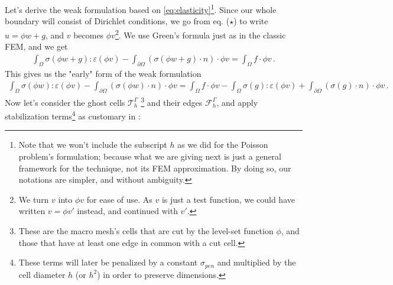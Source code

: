 Let's derive the weak formulation based on \eqref{eq:elasticity}\footnote{Note that we won't include the subscript $h$ as we did for the Poisson problem's \phifem formulation; because what we are giving next is just a general framework for the technique, not its FEM approximation. By doing so, our notations are simpler, and without ambiguity.}. Since our whole boundary will consist of Dirichlet conditions, we go from eq. ($\star$) to write $u=\phi w + g$, and $v$ becomes $\phi v$\footnote{We turn $v$ into $\phi v$ for ease of use. As $v$ is just a test function, we could have written $v = \phi v'$ instead, and continued with $v'$.}. We use Green's formula just as in the classic FEM, and we get
\begin{align*}
    \int_{\Omega} \sigma(\phi w + g) : \varepsilon(\phi v) - \int_{\partial\Omega} (\sigma(\phi w + g) \cdot n)  \cdot \phi v = \int_{\Omega} f \cdot \phi v \,.
\end{align*}
This gives us the "early" form of the weak formulation
\begin{align}
    \int_{\Omega} \sigma(\phi w) : \varepsilon(\phi v) - \int_{\partial\Omega} (\sigma(\phi w) \cdot n) \cdot \phi v = \int_{\Omega} f \cdot \phi v - \int_{\Omega} \sigma(g) : \varepsilon(\phi v) + \int_{\partial\Omega} (\sigma(g) \cdot n) \cdot \phi  v \,.
    \label{eq:1}
\end{align}
Now let's consider the ghost cells $\mathcal{T}_h^{\Gamma}$ \footnote{These are the macro mesh's cells that are cut by the level-set function $\phi$, and those that have at least one edge in common with a cut cell.} and their edges $\mathcal{F}_h^{\Gamma}$, and apply stabilization terms\footnote{These terms will later be penalized by a constant $\sigma_{pen}$ and multiplied by the cell diameter $h$ (or $h^2$) in order to preserve dimensions.} as customary in \phifem :
